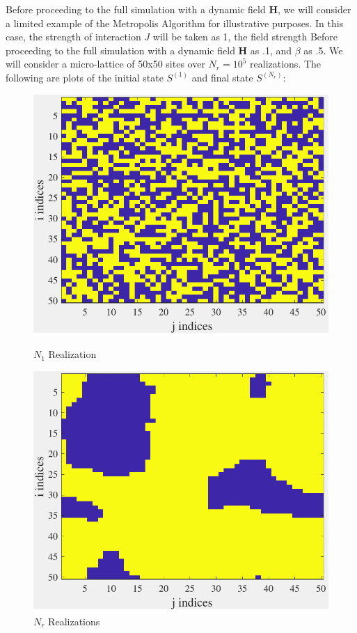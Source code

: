 \documentclass{article}
\begin{document}
Before proceeding to the full simulation with a dynamic field $\textbf{H}$, we will consider a limited example of the Metropolis Algorithm for illustrative purposes. In this case, the strength of interaction $J$ will be taken as 1, the field strength 
Before proceeding to the full simulation with a dynamic field $\textbf{H}$ as .1, and $\beta$ as .5. We will consider a micro-lattice of 50x50 sites over $N_r = 10^5$ realizations. The following are plots of the initial state $S^{(1)}$ and final state $S^{(N_r)}$: 
\begin{figure}[H]
  \centering
  \begin{minipage}[b]{0.49\textwidth}
    \includegraphics[width=\textwidth]{initialS.pdf}
    \caption{$N_1$ Realization}

  \end{minipage}
  \hfill
  \begin{minipage}[b]{0.49\textwidth}
    \includegraphics[width=\textwidth]{finalS.pdf}
    \caption{$N_r$ Realizations}

  \end{minipage}
\end{figure}
\end{document}
